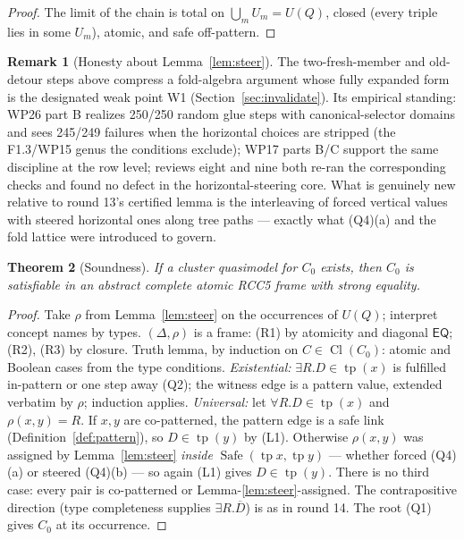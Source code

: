 \documentclass[11pt]{article}
\newtheorem{theorem}{Theorem}[section]
\theoremstyle{definition}
\newtheorem{remark}[theorem]{Remark}
\newcommand{\EQ}{\mathsf{EQ}}
\newcommand{\Cl}{\operatorname{Cl}}
\newcommand{\tp}{\operatorname{tp}}
\newcommand{\Safe}{\operatorname{Safe}}
\begin{document}
\begin{proof}
The limit of the chain is total on
$\bigcup_m U_m=U(Q)$, closed (every triple lies in some $U_m$), atomic,
and safe off-pattern.
\end{proof}

\begin{remark}[Honesty about Lemma~\ref{lem:steer}]
The two-fresh-member and old-detour steps above compress a fold-algebra
argument whose fully expanded form is the designated weak point W1
(Section~\ref{sec:invalidate}).  Its empirical standing: WP26 part B
realizes 250/250 random glue steps with canonical-selector domains and
sees 245/249 failures when the horizontal choices are stripped (the
F1.3/WP15 genus the conditions exclude); WP17 parts B/C support the
same discipline at the row level; reviews eight and nine both re-ran
the corresponding checks and found no defect in the horizontal-steering
core.  What is genuinely new relative to round 13's certified lemma is
the interleaving of forced vertical values with steered horizontal
ones along tree paths --- exactly what (Q4)(a) and the fold lattice
were introduced to govern.
\end{remark}

\begin{theorem}[Soundness]\label{thm:sound}
If a cluster quasimodel for $C_0$ exists, then $C_0$ is satisfiable in
an abstract complete atomic RCC5 frame with strong equality.
\end{theorem}

\begin{proof}
Take $\rho$ from Lemma~\ref{lem:steer} on the occurrences of $U(Q)$;
interpret concept names by types.  $(\Delta,\rho)$ is a frame: (R1) by
atomicity and diagonal $\EQ$; (R2), (R3) by closure.  Truth lemma, by
induction on $C\in\Cl(C_0)$: atomic and Boolean cases from the type
conditions.  \emph{Existential:} $\exists R.D\in\tp(x)$ is fulfilled
in-pattern or one step away (Q2); the witness edge is a pattern value,
extended verbatim by $\rho$; induction applies.  \emph{Universal:} let
$\forall R.D\in\tp(x)$ and $\rho(x,y)=R$.  If $x,y$ are co-patterned,
the pattern edge is a safe link (Definition~\ref{def:pattern}), so
$D\in\tp(y)$ by (L1).  Otherwise $\rho(x,y)$ was assigned by
Lemma~\ref{lem:steer} \emph{inside} $\Safe(\tp x,\tp y)$ --- whether
forced (Q4)(a) or steered (Q4)(b) --- so again (L1) gives
$D\in\tp(y)$.  There is no third case: every pair is co-patterned or
Lemma-\ref{lem:steer}-assigned.  The contrapositive direction
(type completeness supplies $\exists R.\overline D$) is as in round 14.
The root (Q1) gives $C_0$ at its occurrence.
\end{proof}
\end{document}
